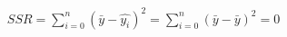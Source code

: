 \documentclass[10pt]{article}
\begin{document}
\begin{align*}SSR = {\sum\limits_{i=0}^n} (\bar{y} - \hat{y_i})^2 = {\sum\limits_{i=0}^n} (\bar{y} - \bar{y})^2 = 0\end{align*}
\end{document}

